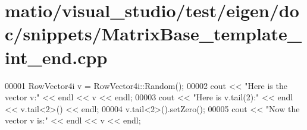 \hypertarget{matio_2visual__studio_2test_2eigen_2doc_2snippets_2_matrix_base__template__int__end_8cpp_source}{}\section{matio/visual\+\_\+studio/test/eigen/doc/snippets/\+Matrix\+Base\+\_\+template\+\_\+int\+\_\+end.cpp}
\label{matio_2visual__studio_2test_2eigen_2doc_2snippets_2_matrix_base__template__int__end_8cpp_source}

\begin{DoxyCode}
00001 RowVector4i v = RowVector4i::Random();
00002 cout << \textcolor{stringliteral}{"Here is the vector v:"} << endl << v << endl;
00003 cout << \textcolor{stringliteral}{"Here is v.tail(2):"} << endl << v.tail<2>() << endl;
00004 v.tail<2>().setZero();
00005 cout << \textcolor{stringliteral}{"Now the vector v is:"} << endl << v << endl;
\end{DoxyCode}
